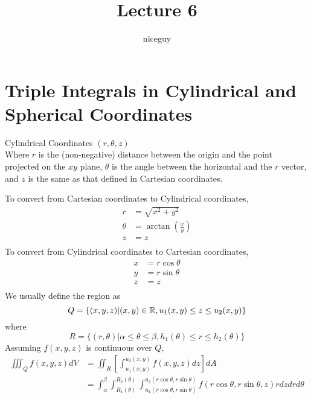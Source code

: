 \documentclass[12pt]{article}
\author{niceguy}
\title{Lecture 6}
\begin{document}
\maketitle

\section{Triple Integrals in Cylindrical and Spherical Coordinates}

\begin{defn}
	Cylindrical Coordinates $(r,\theta,z)$ \\
	Where $r$ is the (non-negative) distance between the origin and the point projected on the $xy$ plane, $\theta$ is the angle between the horizontal and the $r$ vector, and $z$ is the same as that defined in Cartesian coordinates. \\
\end{defn}
To convert from Cartesian coordinates to Cylindrical coordinates,
\begin{align*}
	r &= \sqrt{x^2+y^2} \\
	\theta &= \arctan\left(\frac{x}{y}\right) \\
	z &= z \\
\end{align*}
To convert from Cylindrical coordinates to Cartesian coordinates,
\begin{align*}
	x &= r\cos\theta \\
	y &= r\sin\theta \\
	z &= z \\
\end{align*}
We usually define the region as
$$Q = \{(x,y,z)|(x,y) \in\mathbb{R}, u_1(x,y) \leq z \leq u_2(x,y)\}$$
where
$$R = \{(r,\theta)|\alpha \leq \theta \leq \beta, h_1(\theta) \leq r \leq h_2(\theta)\}$$
Assuming $f(x,y,z)$ is continuous over $Q$,
\begin{align*}
	\iiint_Q f(x,y,z)dV &= \iint_R \left[\int_{u_1(x,y)}^{u_2(x,y)} f(x,y,z)dz\right]dA \\
			    &= \int_\alpha^\beta \int_{R_1(\theta)}^{R_2(\theta)} \int_{u_1(r\cos\theta,r\sin\theta)}^{u_2(r\cos\theta,r\sin\theta)} f(r\cos\theta,r\sin\theta,z)rdzdrd\theta \\
\end{align*}
\end{document}
